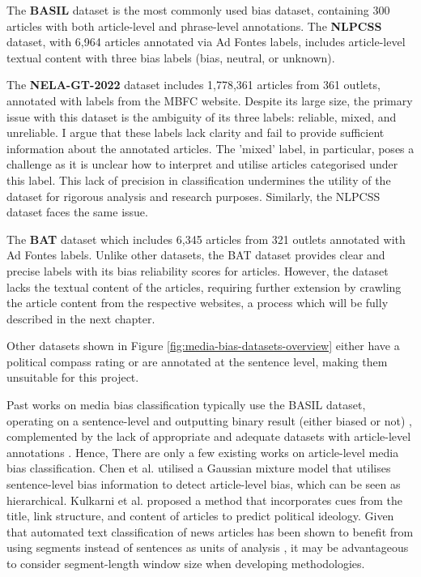 The \textbf{BASIL} dataset \cite{fan-2019-basil} is the most commonly used bias dataset, containing 300 articles with both article-level and phrase-level annotations. The \textbf{NLPCSS} \cite{chen-2020-nlpcss} dataset, with 6,964 articles annotated via Ad Fontes labels, includes article-level textual content with three bias labels (bias, neutral, or unknown).

The \textbf{NELA-GT-2022} dataset \cite{gruppi-2023-nela-gt-2022} includes 1,778,361 articles from 361 outlets, annotated with labels from the MBFC \cite{mbfc} website. Despite its large size, the primary issue with this dataset is the ambiguity of its three labels: reliable, mixed, and unreliable. I argue that these labels lack clarity and fail to provide sufficient information about the annotated articles. The 'mixed' label, in particular, poses a challenge as it is unclear how to interpret and utilise articles categorised under this label. This lack of precision in classification undermines the utility of the dataset for rigorous analysis and research purposes. Similarly, the NLPCSS dataset faces the same issue.

The \textbf{BAT} dataset \cite{spinde-2023-bat} which includes 6,345 articles from 321 outlets annotated with Ad Fontes labels. Unlike other datasets, the BAT dataset provides clear and precise labels with its bias reliability scores for articles. However, the dataset lacks the textual content of the articles, requiring further extension by crawling the article content from the respective websites, a process which will be fully described in the next chapter.

Other datasets shown in Figure \ref{fig:media-bias-datasets-overview} either have a political compass rating or are annotated at the sentence level, making them unsuitable for this project.

Past works on media bias classification typically use the BASIL dataset, operating on a sentence-level and outputting binary result (either biased or not) \cite{maab-2023-lexical-bias-detection, maab-2023-target-aware, guo-2022-modeling, van-den-berg-2020-context,lee-2021-unifying,lei-2022-sentence,lei-2024-event-relation}, complemented by the lack of appropriate and adequate datasets with article-level annotations \cite{demidov-2023-political-bias-classification}. Hence, There are only a few existing works on article-level media bias classification. Chen et al. \cite{chen-2020-detecting-media-bias-gaussian} utilised a Gaussian mixture model that utilises sentence-level bias information to detect article-level bias, which can be seen as hierarchical. Kulkarni et al. \cite{kulkarni-2018-multi-view} proposed a method that incorporates cues from the title, link structure, and content of articles to predict political ideology. Given that automated text classification of news articles has been shown to benefit from using segments instead of sentences as units of analysis \cite{barbera-2021-article-classification}, it may be advantageous to consider segment-length window size when developing methodologies.

